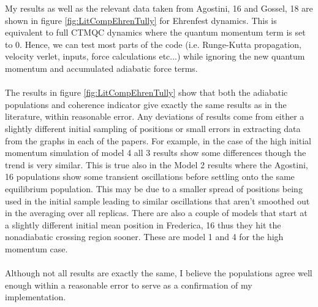\noindent My results as well as the relevant data taken from Agostini, 16 and Gossel, 18 \cite{agostini_quantum-classical_2016, gossel_coupled-trajectory_2018} are shown in figure \ref{fig:LitCompEhrenTully} for Ehrenfest dynamics. This is equivalent to full CTMQC dynamics where the quantum momentum term is set to 0. Hence, we can test most parts of the code (i.e. Runge-Kutta propagation, velocity verlet, inputs, force calculations etc...) while ignoring the new quantum momentum and accumulated adiabatic force terms.
\\\\
The results in figure \ref{fig:LitCompEhrenTully} show that both the adiabatic populations and coherence indicator give exactly the same results as in the literature, within reasonable error. Any deviations of results come from either a slightly different initial sampling of positions or small errors in extracting data from the graphs in each of the papers. For example, in the case of the high initial momentum simulation of model 4 all 3 results show some differences though the trend is very similar. This is true also in the Model 2 results where the Agostini, 16 populations show some transient oscillations before settling onto the same equilibrium population. This may be due to a smaller spread of positions being used in the initial sample leading to similar oscillations that aren't smoothed out in the averaging over all replicas. There are also a couple of models that start at a slightly different initial mean position in Frederica, 16 thus they hit the nonadiabatic crossing region sooner. These are model 1 and 4 for the high momentum case.
\\\\
Although not all results are exactly the same, I believe the populations agree well enough within a reasonable error to serve as a confirmation of my implementation.
